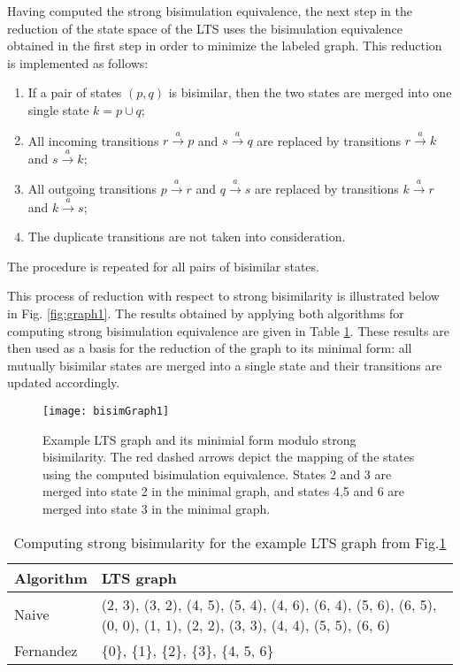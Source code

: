 Having computed the strong bisimulation equivalence, the next step in the reduction of the state space of the LTS uses the bisimulation equivalence obtained in the first step in order to minimize the labeled graph. This reduction is implemented as follows:
\begin{enumerate}
	\item If a pair of states $(p, q)$ is bisimilar, then the two states are merged into one single state $k=p\cup q$;
	\item All incoming transitions $r \stackrel{a}{\rightarrow} p$ and $s \stackrel{a}{\rightarrow} q$ are replaced by transitions $r \stackrel{a}{\rightarrow} k$ and $s \stackrel{a}{\rightarrow} k$;
	\item All outgoing transitions $p \stackrel{a}{\rightarrow} r$ and $q \stackrel{a}{\rightarrow} s$ are replaced by transitions $k \stackrel{a}{\rightarrow} r$ and $k \stackrel{a}{\rightarrow} s$;
	\item The duplicate transitions are not taken into consideration.
\end{enumerate}
The procedure is repeated for all pairs of bisimilar states.

This process of reduction with respect to strong bisimilarity is illustrated below in Fig. \ref{fig:graph1}. The results obtained by applying both algorithms for computing strong bisimulation equivalence are given in Table \ref{table1}. These results are then used as a basis for the reduction of the graph to its minimal form: all mutually bisimilar states are merged into a single state and their transitions are updated accordingly. 

\begin{figure}[h]
	\centering
	\texttt{[image: bisimGraph1]}
	\caption{Example LTS graph and its minimial form modulo strong bisimilarity. The red dashed arrows depict the mapping of the states using the computed bisimulation equivalence. States 2 and 3 are merged into state 2 in the minimal graph, and states 4,5 and 6 are merged into state 3 in the minimal graph.}
	\label{fig:bisimGraph1}
\end{figure}

\begin{table}[h]
\begin{tabular}{| l | p{10.5cm}| }
  \hline                       
  Algorithm & LTS graph \\ \hline
  Naive & (2, 3), (3, 2), (4, 5), 
(5, 4), (4, 6), (6, 4), (5, 6), (6, 5), (0, 0), (1, 1), (2, 2), (3, 3), (4, 4), (5, 5), (6, 6) \\ \hline
  Fernandez & \{0\}, \{1\}, \{2\}, \{3\}, \{4, 5, 6\} \\ \hline  
\end{tabular}
\\
\caption{Computing strong bisimularity for the example LTS graph from Fig.\ref{fig:bisimGraph1}}
\label{table1}
\end{table}

